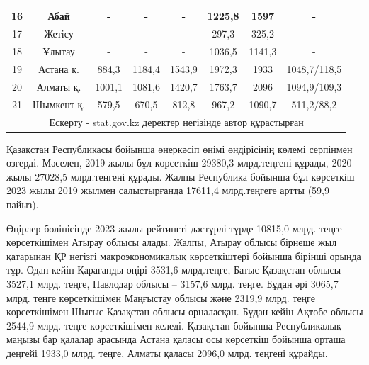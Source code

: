 \begin{table}[H]
{\begin{tabular}{|cccccccc|}
\multicolumn{1}{|c|}{16} &
  \multicolumn{1}{c|}{Абай} &
  \multicolumn{1}{c|}{-} &
  \multicolumn{1}{c|}{-} &
  \multicolumn{1}{c|}{-} &
  \multicolumn{1}{c|}{1225,8} &
  \multicolumn{1}{c|}{1597} &
  - \\ \hline
\multicolumn{1}{|c|}{17} &
  \multicolumn{1}{c|}{Жетісу} &
  \multicolumn{1}{c|}{-} &
  \multicolumn{1}{c|}{-} &
  \multicolumn{1}{c|}{-} &
  \multicolumn{1}{c|}{297,3} &
  \multicolumn{1}{c|}{325,2} &
  - \\ \hline
\multicolumn{1}{|c|}{18} &
  \multicolumn{1}{c|}{Ұлытау} &
  \multicolumn{1}{c|}{-} &
  \multicolumn{1}{c|}{-} &
  \multicolumn{1}{c|}{-} &
  \multicolumn{1}{c|}{1036,5} &
  \multicolumn{1}{c|}{1141,3} &
  - \\ \hline
\multicolumn{1}{|c|}{19} &
  \multicolumn{1}{c|}{Астана қ.} &
  \multicolumn{1}{c|}{884,3} &
  \multicolumn{1}{c|}{1184,4} &
  \multicolumn{1}{c|}{1543,9} &
  \multicolumn{1}{c|}{1972,3} &
  \multicolumn{1}{c|}{1933} &
  1048,7/118,5 \\ \hline
\multicolumn{1}{|c|}{20} &
  \multicolumn{1}{c|}{Алматы қ.} &
  \multicolumn{1}{c|}{1001,1} &
  \multicolumn{1}{c|}{1081,6} &
  \multicolumn{1}{c|}{1420,7} &
  \multicolumn{1}{c|}{1763,7} &
  \multicolumn{1}{c|}{2096} &
  1094,9/109,3 \\ \hline
\multicolumn{1}{|c|}{21} &
  \multicolumn{1}{c|}{Шымкент қ.} &
  \multicolumn{1}{c|}{579,5} &
  \multicolumn{1}{c|}{670,5} &
  \multicolumn{1}{c|}{812,8} &
  \multicolumn{1}{c|}{967,2} &
  \multicolumn{1}{c|}{1090,7} &
  511,2/88,2 \\ \hline
\multicolumn{8}{|c|}{Ескерту - stat.gov.kz деректер негізінде автор құрастырған} \\ \hline
\end{tabular}%
}
\end{table}

\begin{multicols}{2}
  
Қазақстан Республикасы бойынша өнеркәсіп өнімі өндірісінің көлемі
серпінмен өзгерді. Мәселен, 2019 жылы бұл көрсеткіш 29380,3 млрд.теңгені
құрады, 2020 жылы 27028,5 млрд.теңгені құрады. Жалпы Республика бойынша
бұл көрсеткіш 2023 жылы 2019 жылмен салыстырғанда 17611,4 млрд.теңгеге
артты (59,9 пайыз).

Өңірлер бөлінісінде 2023 жылы рейтингті дәстүрлі түрде 10815,0 млрд.
теңге көрсеткішімен Атырау облысы алады. Жалпы, Атырау облысы бірнеше
жыл қатарынан ҚР негізгі макроэкономикалық көрсеткіштері бойынша бірінші
орында тұр. Одан кейін Қарағанды өңірі 3531,6 млрд.теңге, Батыс
Қазақстан облысы -- 3527,1 млрд. теңге, Павлодар облысы -- 3157,6 млрд.
теңге. Бұдан әрі 3065,7 млрд. теңге көрсеткішімен Маңғыстау облысы және
2319,9 млрд. теңге көрсеткішімен Шығыс Қазақстан облысы орналасқан.
Бұдан кейін Ақтөбе облысы 2544,9 млрд. теңге көрсеткішімен келеді.
Қазақстан бойынша Республикалық маңызы бар қалалар арасында Астана қаласы осы
көрсеткіш бойынша орташа деңгейі 1933,0 млрд. теңге, Алматы қаласы
2096,0 млрд. теңгені құрайды.

\end{multicols}


